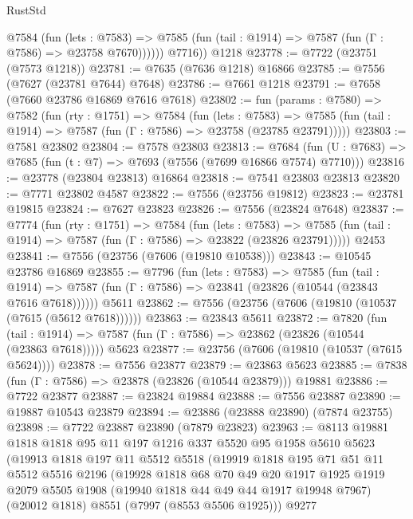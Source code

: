 \begin{lexlean}{RustStd}
\begin{coremodule}
            @7584
              (fun (lets : @7583) =>
              @7585 (fun (tail : @1914) => @7587 (fun (Γ : @7586) => @23758 @7670))))))
        @7716))
    @1218
@23778 := @7722 (@23751 (@7573 @1218))
@23781 := @7635 (@7636 @1218) @16866
@23785 := @7556 (@7627 (@23781 @7644) @7648)
@23786 := @7661 @1218
@23791 := @7658 (@7660 @23786 @16869 @7616 @7618)
@23802 := fun (params : @7580) =>
  @7582
    (fun (rty : @1751) =>
    @7584
      (fun (lets : @7583) =>
      @7585 (fun (tail : @1914) => @7587 (fun (Γ : @7586) => @23758 (@23785 @23791)))))
@23803 := @7581 @23802
@23804 := @7578 @23803
@23813 := @7684
    (fun (U : @7683) => @7685 (fun (t : @7) => @7693 (@7556 (@7699 @16866 @7574) @7710)))
@23816 := @23778 (@23804 @23813) @16864
@23818 := @7541 @23803 @23813
@23820 := @7771 @23802 @4587
@23822 := @7556 (@23756 @19812)
@23823 := @23781 @19815
@23824 := @7627 @23823
@23826 := @7556 (@23824 @7648)
@23837 := @7774
    (fun (rty : @1751) =>
    @7584
      (fun (lets : @7583) =>
      @7585 (fun (tail : @1914) => @7587 (fun (Γ : @7586) => @23822 (@23826 @23791)))))
    @2453
@23841 := @7556 (@23756 (@7606 (@19810 @10538)))
@23843 := @10545 @23786 @16869
@23855 := @7796
    (fun (lets : @7583) =>
    @7585
      (fun (tail : @1914) =>
      @7587 (fun (Γ : @7586) => @23841 (@23826 (@10544 (@23843 @7616 @7618))))))
    @5611
@23862 := @7556 (@23756 (@7606 (@19810 (@10537 (@7615 (@5612 @7618))))))
@23863 := @23843 @5611
@23872 := @7820
    (fun (tail : @1914) => @7587 (fun (Γ : @7586) => @23862 (@23826 (@10544 (@23863 @7618)))))
    @5623
@23877 := @23756 (@7606 (@19810 (@10537 (@7615 @5624))))
@23878 := @7556 @23877
@23879 := @23863 @5623
@23885 := @7838 (fun (Γ : @7586) => @23878 (@23826 (@10544 @23879))) @19881
@23886 := @7722 @23877
@23887 := @23824 @19884
@23888 := @7556 @23887
@23890 := @19887 @10543 @23879
@23894 := @23886 (@23888 @23890) (@7874 @23755)
@23898 := @7722 @23887 @23890 (@7879 @23823)
@23963 := @8113
    @19881
    @1818
    @1818
    @95
    @11
    @197
    @1216
    @337
    @5520
    @95
    @1958
    @5610
    @5623
    (@19913
      @1818
      @197
      @11
      @5512
      @5518
      (@19919
        @1818
        @195
        @71
        @51
        @11
        @5512
        @5516
        @2196
        (@19928
          @1818
          @68
          @70
          @49
          @20
          @1917
          @1925
          @1919
          @2079
          @5505
          @1908
          (@19940 @1818 @44 @49 @44 @1917 @19948 @7967)
          (@20012 @1818)
          @8551
          (@7997 (@8553 @5506 @1925)))
        @9277

\end{coremodule}
\end{lexlean}
